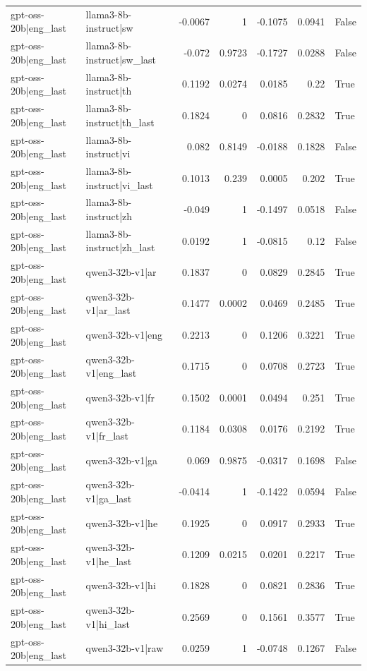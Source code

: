 \begin{table}
\begin{tabular}{l l r r r r l}
gpt-oss-20b|eng_last & llama3-8b-instruct|sw & -0.0067 & 1 & -0.1075 & 0.0941 & False \\
gpt-oss-20b|eng_last & llama3-8b-instruct|sw_last & -0.072 & 0.9723 & -0.1727 & 0.0288 & False \\
gpt-oss-20b|eng_last & llama3-8b-instruct|th & 0.1192 & 0.0274 & 0.0185 & 0.22 & True \\
gpt-oss-20b|eng_last & llama3-8b-instruct|th_last & 0.1824 & 0 & 0.0816 & 0.2832 & True \\
gpt-oss-20b|eng_last & llama3-8b-instruct|vi & 0.082 & 0.8149 & -0.0188 & 0.1828 & False \\
gpt-oss-20b|eng_last & llama3-8b-instruct|vi_last & 0.1013 & 0.239 & 0.0005 & 0.202 & True \\
gpt-oss-20b|eng_last & llama3-8b-instruct|zh & -0.049 & 1 & -0.1497 & 0.0518 & False \\
gpt-oss-20b|eng_last & llama3-8b-instruct|zh_last & 0.0192 & 1 & -0.0815 & 0.12 & False \\
gpt-oss-20b|eng_last & qwen3-32b-v1|ar & 0.1837 & 0 & 0.0829 & 0.2845 & True \\
gpt-oss-20b|eng_last & qwen3-32b-v1|ar_last & 0.1477 & 0.0002 & 0.0469 & 0.2485 & True \\
gpt-oss-20b|eng_last & qwen3-32b-v1|eng & 0.2213 & 0 & 0.1206 & 0.3221 & True \\
gpt-oss-20b|eng_last & qwen3-32b-v1|eng_last & 0.1715 & 0 & 0.0708 & 0.2723 & True \\
gpt-oss-20b|eng_last & qwen3-32b-v1|fr & 0.1502 & 0.0001 & 0.0494 & 0.251 & True \\
gpt-oss-20b|eng_last & qwen3-32b-v1|fr_last & 0.1184 & 0.0308 & 0.0176 & 0.2192 & True \\
gpt-oss-20b|eng_last & qwen3-32b-v1|ga & 0.069 & 0.9875 & -0.0317 & 0.1698 & False \\
gpt-oss-20b|eng_last & qwen3-32b-v1|ga_last & -0.0414 & 1 & -0.1422 & 0.0594 & False \\
gpt-oss-20b|eng_last & qwen3-32b-v1|he & 0.1925 & 0 & 0.0917 & 0.2933 & True \\
gpt-oss-20b|eng_last & qwen3-32b-v1|he_last & 0.1209 & 0.0215 & 0.0201 & 0.2217 & True \\
gpt-oss-20b|eng_last & qwen3-32b-v1|hi & 0.1828 & 0 & 0.0821 & 0.2836 & True \\
gpt-oss-20b|eng_last & qwen3-32b-v1|hi_last & 0.2569 & 0 & 0.1561 & 0.3577 & True \\
gpt-oss-20b|eng_last & qwen3-32b-v1|raw & 0.0259 & 1 & -0.0748 & 0.1267 & False \\

\end{tabular}
\end{table}
